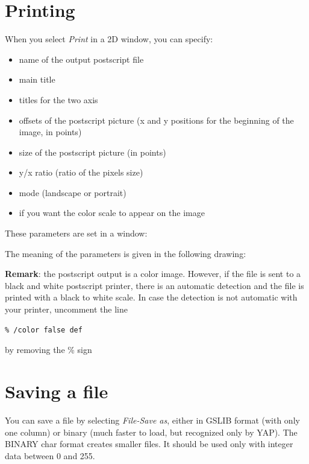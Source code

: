 \section{Printing}
When you select {\em Print} in a 2D window, you can specify:
\begin{itemize}\itemsep -0.3cm
\item name of the output postscript file
\item main title
\item titles for the two axis
\item offsets of the postscript picture (x and y positions for the beginning
      of the image, in points)
\item size of the postscript picture (in points)
\item y/x ratio (ratio of the pixels size)
\item mode (landscape or portrait)
\item if you want the color scale to appear on the image
\end{itemize}

These parameters are set in a window:\\
\vspace{389pt}

The meaning of the parameters is given in the following drawing:\\
\vspace{423pt}

{\bf Remark}: the postscript output is a color image. However, if the file
is sent to a black and white postscript printer, there is an automatic
detection and the file is printed with a black to white scale.
In case the detection is not automatic with your printer, uncomment the line
\begin{verbatim}
% /color false def
\end{verbatim}
by removing the \% sign

\section{Saving a file}
\label{saving}

You can save a file by selecting {\em File-Save as}, either in GSLIB
format (with only one column) or binary (much faster to load, but recognized
only by YAP).
The BINARY char format creates smaller files. It should be used only with
integer data between 0 and 255.\\
\vspace{184pt}

